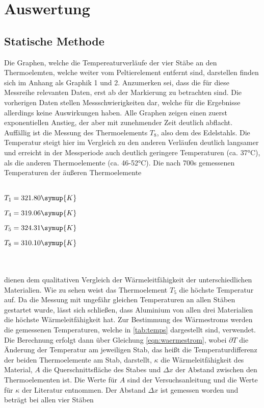 \section{Auswertung}
\label{sec:Auswertung}
\subsection{Statische Methode}
Die Graphen, welche die Tempereaturverläufe der vier Stäbe an den Thermoelemten, welche weiter vom Peltierelement entfernt sind, darstellen finden
sich im Anhang als Graphik 1 und 2. Anzumerken sei, dass die für diese Messreihe relevanten Daten, erst ab der Markierung zu betrachten sind. Die vorherigen
Daten stellen Messschwierigkeiten dar, welche für die Ergebnisse allerdings keine Auswirkungen haben. Alle Graphen zeigen einen zuerst exponentiellen 
Anstieg, der aber mit zunehmender Zeit deutlich abflacht. Auffällig ist die Messung des Thermoelements $T_8$, also dem des Edelstahls. Die Temperatur 
steigt hier im Vergleich zu den anderen Verläufen deutlich langsamer und erreicht in der Messperiode auch deutlich geringere Temperaturen (ca. 37°C), als die 
anderen Thermoelemente (ca. 46-52°C). Die nach 700s gemessenen Temperaturen der äußeren Thermoelemente
\\ \\
\centerline{$T_1 = 321.80 \symup{K}$}
\centerline{$T_4 =  319.06 \symup{K}$}
\centerline{$T_5 =  324.31 \symup{K}$}
\centerline{$T_8 =  310.10 \symup{K}$}
\\ \\
dienen dem qualitativen Vergleich der Wärmeleitfähigkeit der unterschiedlichen Materialien.
Wie zu sehen weist das Thermoelement $T_5$ die höchste Temperatur auf. Da die Messung mit ungefähr gleichen Temperaturen an allen Stäben gestartet wurde,
lässt sich schließen, dass Aluminium von allen drei Materialien die höchste Wärmeleitfähigkeit hat. 
Zur Bestimmung des Wärmestroms werden die gemessenen Temperaturen, welche in \autoref{tab:temps} dargestellt sind, verwendet. 
Die Berechnung erfolgt dann über Gleichung \eqref{eqn:waermestrom}, wobei $\partial T$ die Änderung der Temperatur am jeweiligen Stab, das heißt 
die Temperaturdifferenz der beiden Thermoelemente am Stab, darstellt, $\kappa$ die Wärmeleitfähigkeit des Material, $A$ die Querschnittsfläche des Stabes und $\Delta x$ der Abstand zwischen den Thermoelementen ist.
Die Werte für $A$ sind der Versuchsanleitung \cite[2]{V204} und die Werte für $\kappa$ der Literatur \cite{unknown} entnommen. Der Abstand $\Delta x$ ist gemessen worden und beträgt bei allen vier Stäben
